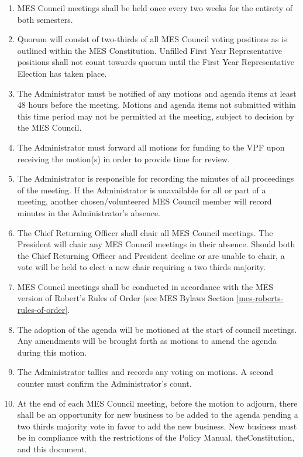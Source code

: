 \begin{enumerate}
 \item
  MES Council meetings shall be held once every two weeks for the entirety of both semesters.
 \item
  Quorum will consist of two-thirds of all MES Council voting positions as is outlined within the MES Constitution. Unfilled First Year Representative positions shall not count towards quorum until the First Year Representative Election has taken place.
 \item
  The Administrator must be notified of any motions and agenda items at least 48 hours before the meeting. Motions and agenda items not submitted within this time period may not be permitted at the meeting, subject to decision by the MES Council.
 \item
  The Administrator must forward all motions for funding to the VPF upon receiving the motion(s) in order to provide time for review.
 \item
  The Administrator is responsible for recording the minutes of all proceedings of the meeting. If the Administrator is unavailable for all or part of a meeting, another chosen/volunteered MES Council member will record minutes in the Administrator's absence.
 \item \label{CRO-chair-meetings}
  The Chief Returning Officer shall chair all MES Council meetings. The
  President will chair any MES Council meetings in their absence. Should
  both the Chief Returning Officer and President decline or are unable
  to chair, a vote will be held to elect a new chair requiring a two
  thirds majority.
 \item
  MES Council meetings shall be conducted in accordance with the MES version of Robert's Rules of Order (see MES Bylaws Section \ref{mes-roberts-rules-of-order}.
 \item
  The adoption of the agenda will be motioned at the start of council meetings. Any amendments will be brought forth as motions to amend the agenda during this motion.
 \item
  The Administrator tallies and records any voting on motions. A second counter must confirm the Administrator's count.
 \item
  At the end of each MES Council meeting, before the motion to adjourn, there shall be an opportunity for new business to be added to the agenda pending a two thirds majority vote in favor to add the new business. New business must be in compliance with the restrictions of the Policy Manual, theConstitution, and this document.

\end{enumerate}
